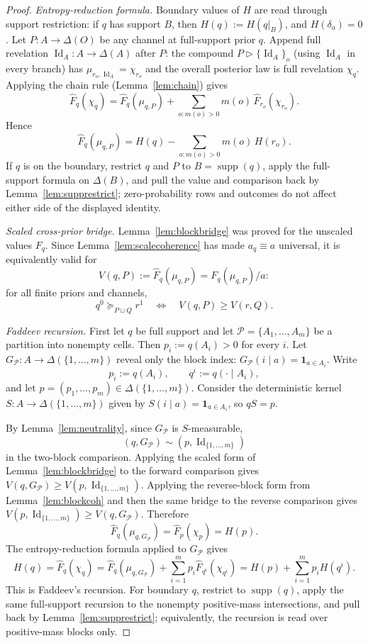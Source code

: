 \documentclass[11pt,a4paper]{article}
\theoremstyle{definition}
\newcommand{\Id}{\operatorname{Id}}
\newcommand{\1}{\mathbf 1}
\begin{document}
\begin{proof}
\emph{Entropy-reduction formula.}  Boundary values of $H$ are read through support restriction: if $q$ has support
$B$, then $H(q):=H(q|_B)$, and $H(\delta_a)=0$.  Let $P:A\to\Delta(O)$ be any channel at full-support prior $q$.  Append
full revelation $\Id_A:A\to\Delta(A)$ after $P$: the compound $P\triangleright\{\Id_A\}_o$ (using $\Id_A$ in every branch)
has $\mu_{r_o,\Id_A}=\chi_{r_o}$ and the overall posterior law is full revelation $\chi_q$.  Applying the chain rule
(Lemma~\ref{lem:chain}) gives
\[
\widehat F_q(\chi_q)
=
\widehat F_q(\mu_{q,P})+\sum_{o:m(o)>0}m(o)\,\widehat F_{r_o}(\chi_{r_o}).
\]
Hence
\[
\widehat F_q(\mu_{q,P})=H(q)-\sum_{o:m(o)>0}m(o)\,H(r_o).
\]
If $q$ is on the boundary, restrict $q$ and $P$ to $B=\operatorname{supp}(q)$, apply the full-support formula on
$\Delta(B)$, and pull the value and comparison back by Lemma~\ref{lem:supprestrict}; zero-probability rows and outcomes
do not affect either side of the displayed identity.

\emph{Scaled cross-prior bridge.}
Lemma~\ref{lem:blockbridge} was proved for the unscaled values $F_q$.  Since Lemma~\ref{lem:scalecoherence} has made
$a_q\equiv a$ universal, it is equivalently valid for
\[
V(q,P):=\widehat F_q(\mu_{q,P})=F_q(\mu_{q,P})/a:
\]
for all finite priors and channels,
\[
q^0\succeq_{P\sqcup Q}r^1
\quad\Longleftrightarrow\quad
V(q,P)\ge V(r,Q).
\]

\emph{Faddeev recursion.}  First let $q$ be full support and let $\mathcal P=\{A_1,\dots,A_m\}$ be a partition into
nonempty cells.  Then $p_i:=q(A_i)>0$ for every $i$.  Let $G_{\mathcal P}:A\to\Delta(\{1,\dots,m\})$ reveal only the
block index: $G_{\mathcal P}(i\mid a)=\1_{a\in A_i}$.  Write
\[
p_i:=q(A_i),\qquad q^i:=q(\cdot\mid A_i),
\]
and let $p=(p_1,\dots,p_m)\in\Delta(\{1,\dots,m\})$.  Consider the deterministic kernel
$S:A\to\Delta(\{1,\dots,m\})$ given by
$S(i\mid a)=\1_{a\in A_i}$, so $qS=p$.

By Lemma~\ref{lem:neutrality}, since $G_{\mathcal P}$ is $S$-measurable,
\[
(q,G_{\mathcal P})\sim(p,\Id_{\{1,\dots,m\}})
\]
in the two-block comparison.  Applying the scaled form of Lemma~\ref{lem:blockbridge} to the forward comparison gives
$V(q,G_{\mathcal P})\ge V(p,\Id_{\{1,\dots,m\}})$.  Applying the reverse-block form from Lemma~\ref{lem:blockcoh} and then
the same bridge to the reverse comparison gives $V(p,\Id_{\{1,\dots,m\}})\ge V(q,G_{\mathcal P})$.  Therefore
\[
\widehat F_q(\mu_{q,G_{\mathcal P}})
=\widehat F_p(\chi_p)=H(p).
\]
The entropy-reduction formula applied to $G_{\mathcal P}$ gives
\[
H(q)=\widehat F_q(\chi_q)
=\widehat F_q(\mu_{q,G_{\mathcal P}})+\sum_{i=1}^m p_i\widehat F_{q^i}(\chi_{q^i})
=H(p)+\sum_{i=1}^m p_iH(q^i).
\]
This is Faddeev's recursion.  For boundary $q$, restrict to $\operatorname{supp}(q)$, apply the same full-support recursion
to the nonempty positive-mass intersections, and pull back by Lemma~\ref{lem:supprestrict}; equivalently, the recursion is
read over positive-mass blocks only.


\end{proof}
\end{document}
